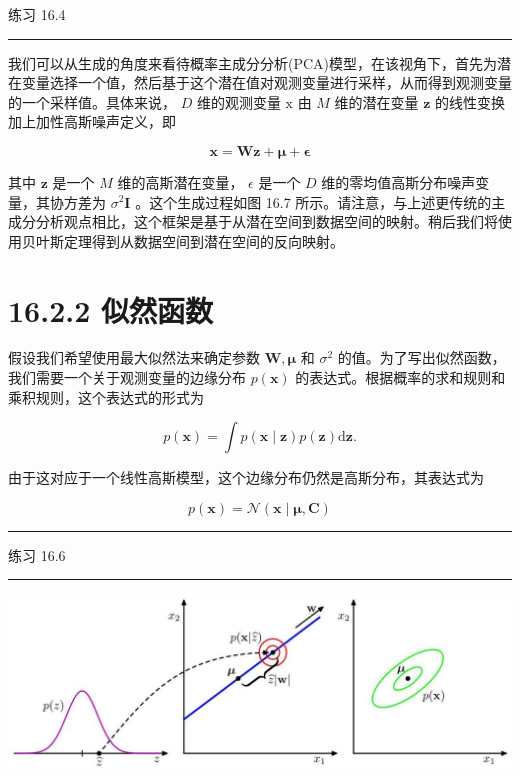 \documentclass[10pt]{article}
\newcommand{\HRule}{\begin{center}\rule{0.9\linewidth}{0.2mm}\end{center}}
\begin{document}
练习 16.4

\HRule

我们可以从生成的角度来看待概率主成分分析(PCA)模型，在该视角下，首先为潜在变量选择一个值，然后基于这个潜在值对观测变量进行采样，从而得到观测变量的一个采样值。具体来说， \(D\) 维的观测变量 \(\mathrm{x}\) 由 \(M\) 维的潜在变量 \(\mathbf{z}\) 的线性变换加上加性高斯噪声定义，即

\[
\mathbf{x} = \mathbf{W}\mathbf{z} + \mathbf{\mu } + \mathbf{\epsilon } \tag{16.33}
\]

其中 \(\mathbf{z}\) 是一个 \(M\) 维的高斯潜在变量， \(\epsilon\) 是一个 \(D\) 维的零均值高斯分布噪声变量，其协方差为 \({\sigma }^{2}\mathbf{I}\) 。这个生成过程如图 16.7 所示。请注意，与上述更传统的主成分分析观点相比，这个框架是基于从潜在空间到数据空间的映射。稍后我们将使用贝叶斯定理得到从数据空间到潜在空间的反向映射。

\section*{16.2.2 似然函数}

假设我们希望使用最大似然法来确定参数 \(\mathbf{W},\mathbf{\mu }\) 和 \({\sigma }^{2}\) 的值。为了写出似然函数，我们需要一个关于观测变量的边缘分布 \(p\left( \mathbf{x}\right)\) 的表达式。根据概率的求和规则和乘积规则，这个表达式的形式为

\[
p\left( \mathbf{x}\right)  = \int p\left( {\mathbf{x} \mid  \mathbf{z}}\right) p\left( \mathbf{z}\right) \mathrm{d}\mathbf{z}. \tag{16.34}
\]

由于这对应于一个线性高斯模型，这个边缘分布仍然是高斯分布，其表达式为

\[
p\left( \mathbf{x}\right)  = \mathcal{N}\left( {\mathbf{x} \mid  \mathbf{\mu },\mathbf{C}}\right)  \tag{16.35}
\]

\HRule

练习 16.6

\HRule

\begin{center}
\includegraphics[max width=1.0\textwidth]{images/0194e279-9b28-703a-88f4-c3ac21e2010d_527_262_343_1275_439_0.jpg}
\end{center}
\hspace*{3em} 
\end{document}

